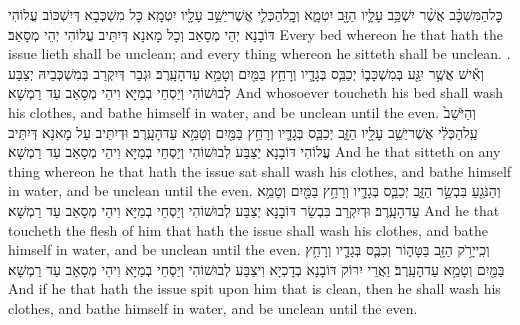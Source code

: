 {כׇּל\maqqaf הַמִּשְׁכָּ֗ב אֲשֶׁ֨ר יִשְׁכַּ֥ב עָלָ֛יו הַזָּ֖ב יִטְמָ֑א וְכׇֽל\maqqaf הַכְּלִ֛י אֲשֶׁר\maqqaf יֵשֵׁ֥ב עָלָ֖יו יִטְמָֽא׃}
{כָּל מִשְׁכְּבָא דְּיִשְׁכּוֹב עֲלוֹהִי דּוֹבָנָא יְהֵי מְסָאַב וְכָל מָאנָא דְּיִתֵּיב עֲלוֹהִי יְהֵי מְסָאַב׃}
{Every bed whereon he that hath the issue lieth shall be unclean; and every thing whereon he sitteth shall be unclean. .}{}
{וְאִ֕ישׁ אֲשֶׁ֥ר יִגַּ֖ע בְּמִשְׁכָּב֑וֹ יְכַבֵּ֧ס בְּגָדָ֛יו וְרָחַ֥ץ בַּמַּ֖יִם וְטָמֵ֥א עַד\maqqaf הָעָֽרֶב׃}
{וּגְבַר דְּיִקְרַב בְּמִשְׁכְּבֵיהּ יְצַבַּע לְבוּשׁוֹהִי וְיַסְחֵי בְמַיָּא וִיהֵי מְסָאַב עַד רַמְשָׁא׃}
{And whosoever toucheth his bed shall wash his clothes, and bathe himself in water, and be unclean until the even.}{}
{וְהַיֹּשֵׁב֙ עַֽל\maqqaf הַכְּלִ֔י אֲשֶׁר\maqqaf יֵשֵׁ֥ב עָלָ֖יו הַזָּ֑ב יְכַבֵּ֧ס בְּגָדָ֛יו וְרָחַ֥ץ בַּמַּ֖יִם וְטָמֵ֥א עַד\maqqaf הָעָֽרֶב׃}
{וּדְיִתֵּיב עַל מָאנָא דְּיִתֵּיב עֲלוֹהִי דּוֹבָנָא יְצַבַּע לְבוּשׁוֹהִי וְיַסְחֵי בְמַיָּא וִיהֵי מְסָאַב עַד רַמְשָׁא׃}
{And he that sitteth on any thing whereon he that hath the issue sat shall wash his clothes, and bathe himself in water, and be unclean until the even.}{}
{וְהַנֹּגֵ֖עַ בִּבְשַׂ֣ר הַזָּ֑ב יְכַבֵּ֧ס בְּגָדָ֛יו וְרָחַ֥ץ בַּמַּ֖יִם וְטָמֵ֥א עַד\maqqaf הָעָֽרֶב׃}
{וּדְיִקְרַב בִּבְשַׂר דּוֹבָנָא יְצַבַּע לְבוּשׁוֹהִי וְיַסְחֵי בְמַיָּא וִיהֵי מְסָאַב עַד רַמְשָׁא׃}
{And he that toucheth the flesh of him that hath the issue shall wash his clothes, and bathe himself in water, and be unclean until the even.}{}
{וְכִֽי\maqqaf יָרֹ֥ק הַזָּ֖ב בַּטָּה֑וֹר וְכִבֶּ֧ס בְּגָדָ֛יו וְרָחַ֥ץ בַּמַּ֖יִם וְטָמֵ֥א עַד\maqqaf הָעָֽרֶב׃}
{וַאֲרֵי יִרּוֹק דּוֹבָנָא בְדָכְיָא וִיצַבַּע לְבוּשׁוֹהִי וְיַסְחֵי בְמַיָּא וִיהֵי מְסָאַב עַד רַמְשָׁא׃}
{And if he that hath the issue spit upon him that is clean, then he shall wash his clothes, and bathe himself in water, and be unclean until the even.}{}
